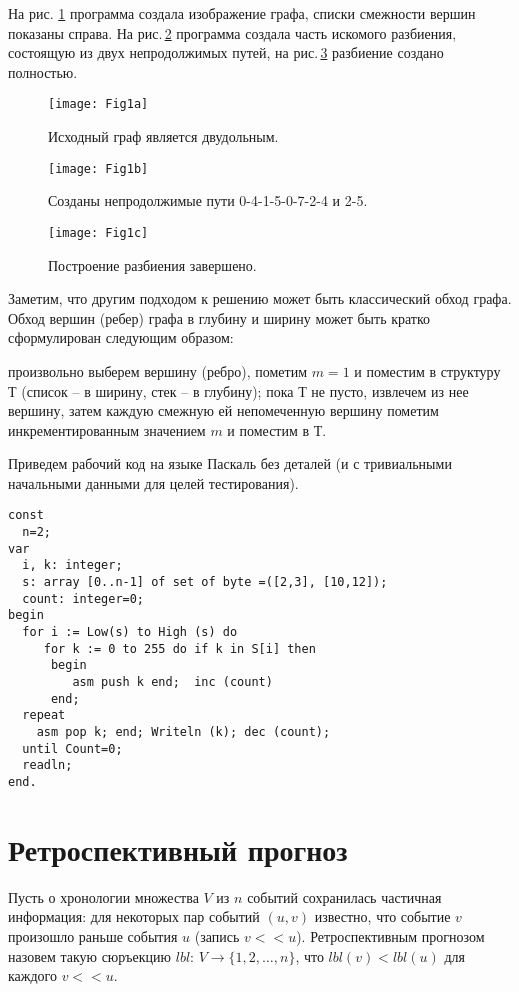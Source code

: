 На рис. \ref{MAM_Fig1a} программа создала изображение графа, списки смежности вершин показаны справа. На рис.\,\ref{MAM_Fig1b} программа создала часть искомого разбиения, состоящую из двух непродолжимых путей, на рис.\,\ref{MAM_Fig1c} разбиение создано полностью.

\begin{figure}[h]
  \texttt{[image: Fig1a]}
  \caption{Исходный граф является двудольным.}\label{MAM_Fig1a}
\end{figure}
\par\medskip
\begin{figure}[h]
  \texttt{[image: Fig1b]}
  \caption{Созданы непродолжимые пути 0-4-1-5-0-7-2-4 и 2-5.}\label{MAM_Fig1b}
\end{figure}
\par\medskip
\begin{figure}[h]
  \texttt{[image: Fig1c]}
  \caption{Построение разбиения завершено.}\label{MAM_Fig1c}
\end{figure}
\par\medskip
Заметим, что другим подходом к решению может быть классический обход графа. Обход вершин (ребер) графа в глубину и ширину может быть кратко сформулирован следующим образом:

произвольно выберем вершину (ребро), пометим $m=1$ и поместим в структуру $Т$ (список – в ширину, стек – в глубину); пока $Т$ не пусто, извлечем из нее вершину, затем каждую смежную ей непомеченную вершину пометим инкрементированным значением $m$ и поместим в $Т$.

Приведем рабочий код на языке Паскаль без деталей (и с тривиальными начальными данными для целей тестирования).
\begin{verbatim}
const
  n=2;
var
  i, k: integer;
  s: array [0..n-1] of set of byte =([2,3], [10,12]);
  count: integer=0;
begin
  for i := Low(s) to High (s) do
     for k := 0 to 255 do if k in S[i] then
      begin
         asm push k end;  inc (count)
      end;
  repeat
    asm pop k; end; Writeln (k); dec (count);
  until Count=0;
  readln;
end.
\end{verbatim}

\section{Ретроспективный прогноз}
Пусть о хронологии множества $V$ из $n$ событий сохранилась частичная информация: для некоторых пар событий $(u,v)$ известно, что событие $v$ произошло раньше события $u$ (запись $v<<u$). Ретроспективным прогнозом назовем такую сюръекцию $lbl$:
$V\rightarrow\{1,2,…, n\}$, что $lbl(v)<lbl(u)$ для каждого $v<<u$.

